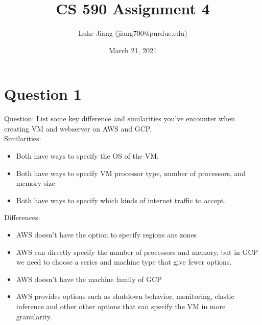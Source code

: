 \documentclass{article}
\title{CS 590 Assignment 4}
\author{Luke Jiang (jiang700@purdue.edu) }
\date{March 21, 2021}
\begin{document}
\maketitle

\section{Question 1}
Question: List some key difference and similarities you’ve encounter when creating VM and webserver on AWS and GCP.\\

Similarities:
\begin{itemize}
    \item Both have ways to specify the OS of the VM.
    \item Both have ways to specify VM processor type, number of processors, and memory size
    \item Both have ways to specify which kinds of internet traffic to accept.
\end{itemize}

Differences:
\begin{itemize}
    \item AWS doesn't have the option to specify regions ans zones
    \item AWS can directly specify the number of processors and memory, but in GCP we need to choose a series and machine type that give fewer options.
    \item AWS doesn't have the machine family of GCP
    \item AWS provides options such as shutdown behavior, monitoring, elastic inference and other other options that can specify the VM in more granularity. 
\end{itemize}
\end{document}
